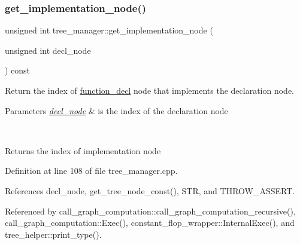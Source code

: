 \subsubsection{\texorpdfstring{get\+\_\+implementation\+\_\+node()}{get\_implementation\_node()}}
{\footnotesize\ttfamily unsigned int tree\+\_\+manager\+::get\+\_\+implementation\+\_\+node (\begin{DoxyParamCaption}\item[{unsigned int}]{decl\+\_\+node }\end{DoxyParamCaption}) const}



Return the index of \hyperlink{structfunction__decl}{function\+\_\+decl} node that implements the declaration node. 


\begin{DoxyParams}{Parameters}
{\em \hyperlink{structdecl__node}{decl\+\_\+node}} & is the index of the declaration node
\begin{DoxyItemize}
\item 
\end{DoxyItemize}\\
\hline
\end{DoxyParams}
\begin{DoxyReturn}{Returns}
the index of implementation node 
\end{DoxyReturn}


Definition at line 108 of file tree\+\_\+manager.\+cpp.



References decl\+\_\+node, get\+\_\+tree\+\_\+node\+\_\+const(), S\+TR, and T\+H\+R\+O\+W\+\_\+\+A\+S\+S\+E\+RT.



Referenced by call\+\_\+graph\+\_\+computation\+::call\+\_\+graph\+\_\+computation\+\_\+recursive(), call\+\_\+graph\+\_\+computation\+::\+Exec(), constant\+\_\+flop\+\_\+wrapper\+::\+Internal\+Exec(), and tree\+\_\+helper\+::print\+\_\+type().

